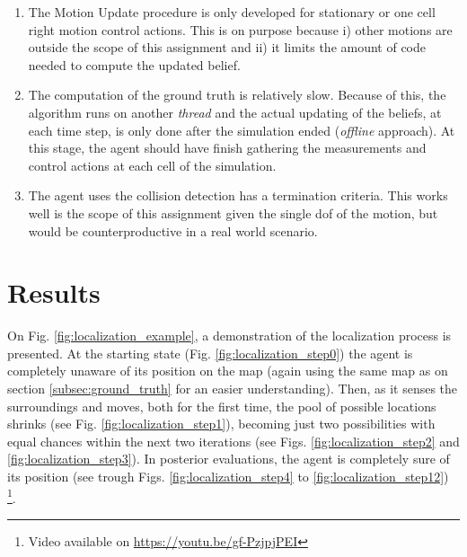 \documentclass[runningheads]{llncs}
\begin{document}
\begin{enumerate}
    \item The Motion Update procedure is only developed for stationary or one cell right motion control actions. This is on purpose because i) other motions are outside the scope of this assignment and ii) it limits the amount of code needed to compute the updated belief.
    \item The computation of the ground truth is relatively slow. Because of this, the algorithm runs on another \emph{thread} and the actual updating of the beliefs, at each time step, is only done after the simulation ended (\emph{offline} approach). At this stage, the agent should have finish gathering the measurements and control actions at each cell of the simulation.
    \item The agent uses the collision detection has a termination criteria. This works well is the scope of this assignment given the single \gls{dof} of the motion, but would be counterproductive in a real world scenario.
\end{enumerate}

\section{Results}
\label{sec:results}

On Fig. \ref{fig:localization_example}, a demonstration of the localization process is presented. At the starting state (Fig. \ref{fig:localization_step0}) the agent is completely unaware of its position on the map (again using the same map as on section \ref{subsec:ground_truth} for an easier understanding). Then, as it senses the surroundings and moves, both for the first time, the pool of possible locations shrinks (see Fig. \ref{fig:localization_step1}), becoming just two possibilities with equal chances within the next two iterations (see Figs. \ref{fig:localization_step2} and \ref{fig:localization_step3}). In posterior evaluations, the agent is completely sure of its position (see trough Figs. \ref{fig:localization_step4} to \ref{fig:localization_step12}) \footnote{Video available on \url{https://youtu.be/gf-PzjpjPEI}}.
\end{document}
